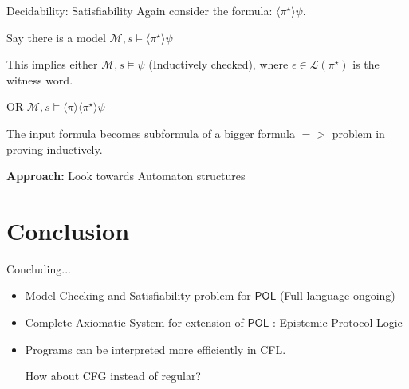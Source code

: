 \documentclass[usenames,dvipsnames]{beamer}
\newcommand\ldiaarg[1]{\langle#1\rangle}
\newcommand{\M}{\mathcal{M}}
\newcommand{\LL}{\mathcal{L}} %
\newcommand{\POL}{\mathsf{POL}}
\begin{document}


    \begin{frame}{Decidability: Satisfiability}
        Again consider the formula: $\ldiaarg{\pi^\star}\psi$.\pause

        Say there is a model $\M,s\vDash\ldiaarg{\pi^\star}\psi$\pause

        This implies either $\M,s\vDash\psi$ (Inductively checked), where $\epsilon\in\LL(\pi^\star)$ is the witness word.\pause

        OR $\M,s\vDash\ldiaarg{\pi}\ldiaarg{\pi^\star}\psi$\pause

        The input formula becomes subformula of a  bigger formula $=>$ problem in proving inductively.\pause

        \textbf{Approach:} Look towards Automaton structures
    \end{frame}
\section{Conclusion}

\begin{frame}{Concluding...}
    \begin{itemize}
    \item  Model-Checking and Satisfiability problem for $\POL$ (Full language ongoing)
 
     \item Complete Axiomatic System for extension of $\POL$ : Epistemic Protocol Logic\footnotemark[1]

     \item Programs can be interpreted more efficiently in CFL.

     How about CFG instead of regular?
 \end{itemize}
\end{frame}

 
\end{document}
